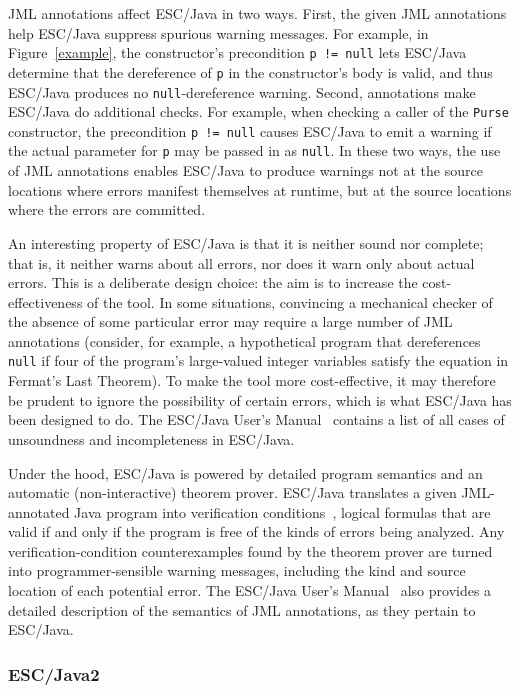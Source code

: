 JML annotations affect ESC/Java in two ways.  First, the given JML
annotations help ESC/Java suppress spurious warning messages.  For
example, in Figure~\ref{example}, the constructor's
precondition \texttt{p != null} lets ESC/Java determine that the
dereference of \texttt{p} in the constructor's body is valid, and thus
ESC/\-Java produces no \texttt{null}-dereference warning.  Second,
annotations make ESC/\-Java do additional checks.  For example,
when checking a caller of the \texttt{Purse} constructor, the
precondition \texttt{p != null} causes ESC/Java to emit a warning if
the actual parameter for \texttt{p} may be passed in as \texttt{null}.
In these two ways, the use of JML annotations enables ESC/Java to
produce warnings not at the source locations where errors manifest
themselves at runtime, but at the source locations where the errors
are committed.

An interesting property of ESC/Java is that it is neither sound nor
complete; that is, it neither warns about all errors, nor does it
warn only about actual errors.  This is a deliberate design choice:
the aim is to increase the cost-effectiveness of the tool.  In some
situations, convincing a mechanical checker of the absence of some
particular error may require a large number of JML annotations
(consider, for example, a hypothetical program that dereferences
\texttt{null} if four of the program's large-valued integer variables
satisfy the equation in Fermat's Last Theorem).  To make the tool more
cost-effective, it may therefore be prudent to ignore the possibility
of certain errors, which is what ESC/Java has been designed to do.
The ESC/Java User's Manual~\cite{escjava:userman} contains a list of
all cases of unsoundness and incompleteness in ESC/Java.

Under the hood, ESC/Java is powered by detailed program semantics and
an automatic (non-interactive) theorem prover.  ESC/Java translates a
given JML-an\-no\-tat\-ed Java program into verification
conditions~\cite{LeinoSaxeStata:JavaViaGC,FlanaganSaxe:POPL01},
logical formulas that are valid if and only if the program is free of
the kinds of errors being analyzed.  Any verification-condition
counterexamples found by the theorem prover are turned into
programmer-sensible warning messages, including the kind and source
location of each potential error.  The ESC/Java User's
Manual~\cite{escjava:userman} also provides a detailed description of
the semantics of JML annotations, as they pertain to ESC/Java.

\subsubsection{ESC/Java2}
\label{escjava2}

